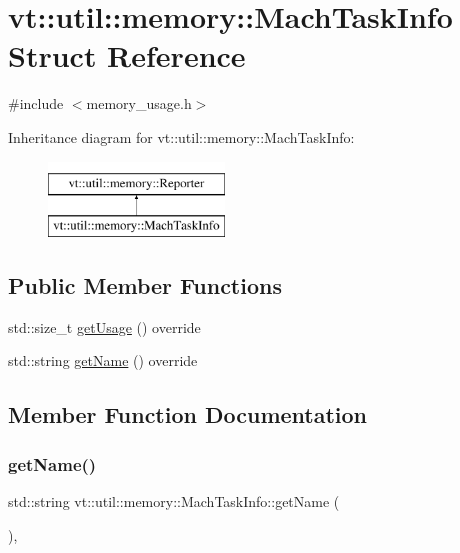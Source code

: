 \hypertarget{structvt_1_1util_1_1memory_1_1_mach_task_info}{}\section{vt\+:\+:util\+:\+:memory\+:\+:Mach\+Task\+Info Struct Reference}
\label{structvt_1_1util_1_1memory_1_1_mach_task_info}


{\ttfamily \#include $<$memory\+\_\+usage.\+h$>$}

Inheritance diagram for vt\+:\+:util\+:\+:memory\+:\+:Mach\+Task\+Info\+:\begin{figure}[H]
\begin{center}
\leavevmode
\includegraphics[height=2.000000cm]{structvt_1_1util_1_1memory_1_1_mach_task_info}
\end{center}
\end{figure}
\subsection*{Public Member Functions}
\begin{DoxyCompactItemize}
\item 
std\+::size\+\_\+t \hyperlink{structvt_1_1util_1_1memory_1_1_mach_task_info_a8d610d4ca50ad62ef2dc623713a67b7d}{get\+Usage} () override
\item 
std\+::string \hyperlink{structvt_1_1util_1_1memory_1_1_mach_task_info_a4800048748574a7d57799c442aa2c390}{get\+Name} () override
\end{DoxyCompactItemize}


\subsection{Member Function Documentation}
\mbox{\label{structvt_1_1util_1_1memory_1_1_mach_task_info_a4800048748574a7d57799c442aa2c390}} 
\subsubsection{\texorpdfstring{get\+Name()}{getName()}}
{\footnotesize\ttfamily std\+::string vt\+::util\+::memory\+::\+Mach\+Task\+Info\+::get\+Name (\begin{DoxyParamCaption}{ }\end{DoxyParamCaption})\hspace{0.3cm}{\ttfamily [override]}, {\ttfamily [virtual]}}



